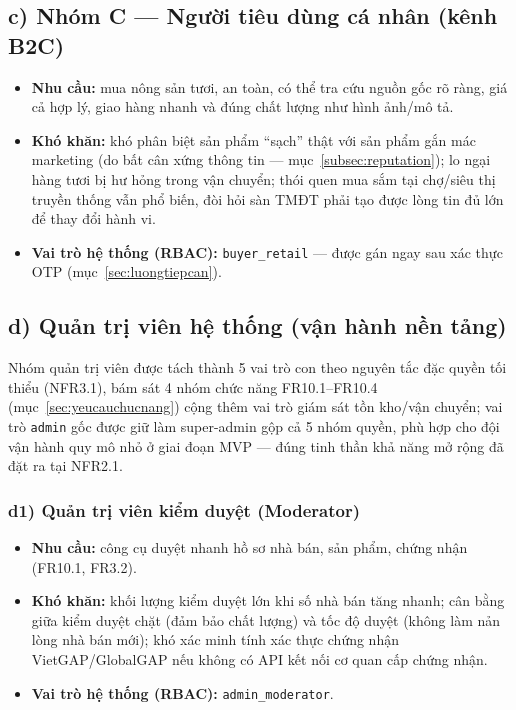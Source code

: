 \subsection*{c) Nhóm C --- Người tiêu dùng cá nhân (kênh B2C)}
\begin{itemize}
    \item \textbf{Nhu cầu:} mua nông sản tươi, an toàn, có thể tra cứu nguồn gốc rõ ràng, giá cả hợp lý, giao hàng nhanh và đúng chất lượng như hình ảnh/mô tả.
    \item \textbf{Khó khăn:} khó phân biệt sản phẩm ``sạch'' thật với sản phẩm gắn mác marketing (do bất cân xứng thông tin --- mục~\ref{subsec:reputation}); lo ngại hàng tươi bị hư hỏng trong vận chuyển; thói quen mua sắm tại chợ/siêu thị truyền thống vẫn phổ biến, đòi hỏi sàn TMĐT phải tạo được lòng tin đủ lớn để thay đổi hành vi.
    \item \textbf{Vai trò hệ thống (RBAC):} \texttt{buyer\_retail} --- được gán ngay sau xác thực OTP (mục~\ref{sec:luongtiepcan}).
\end{itemize}

\subsection*{d) Quản trị viên hệ thống (vận hành nền tảng)}

Nhóm quản trị viên được tách thành 5 vai trò con theo nguyên tắc đặc quyền tối thiểu (NFR3.1), bám sát 4 nhóm chức năng FR10.1--FR10.4 (mục~\ref{sec:yeucauchucnang}) cộng thêm vai trò giám sát tồn kho/vận chuyển; vai trò \texttt{admin} gốc được giữ làm super-admin gộp cả 5 nhóm quyền, phù hợp cho đội vận hành quy mô nhỏ ở giai đoạn MVP --- đúng tinh thần khả năng mở rộng đã đặt ra tại NFR2.1.

\subsubsection*{d1) Quản trị viên kiểm duyệt (Moderator)}
\begin{itemize}
    \item \textbf{Nhu cầu:} công cụ duyệt nhanh hồ sơ nhà bán, sản phẩm, chứng nhận (FR10.1, FR3.2).
    \item \textbf{Khó khăn:} khối lượng kiểm duyệt lớn khi số nhà bán tăng nhanh; cân bằng giữa kiểm duyệt chặt (đảm bảo chất lượng) và tốc độ duyệt (không làm nản lòng nhà bán mới); khó xác minh tính xác thực chứng nhận VietGAP/GlobalGAP nếu không có API kết nối cơ quan cấp chứng nhận.
    \item \textbf{Vai trò hệ thống (RBAC):} \texttt{admin\_moderator}.
\end{itemize}

